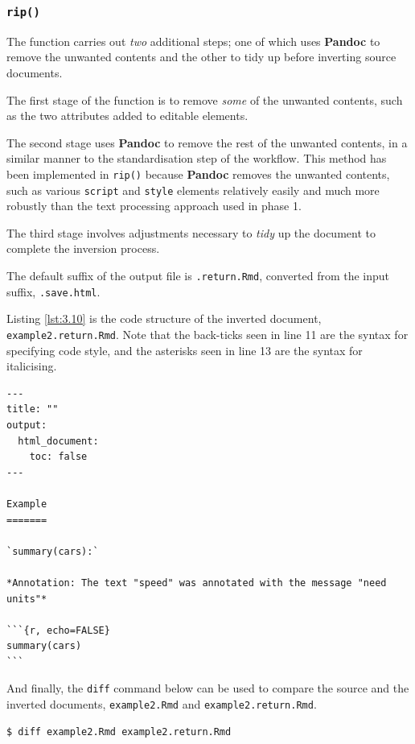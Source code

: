 \documentclass[a4paper, 12pt]{report}
\begin{document}
\subsubsection*{\texttt{rip()}}
The function carries out \emph{two} additional steps; one of which uses \textbf{Pandoc} to remove the unwanted contents and the other to tidy up before inverting source documents.

The first stage of the function is to remove \emph{some} of the unwanted contents, such as the two attributes added to editable elements.

The second stage uses \textbf{Pandoc} to remove the rest of the unwanted contents, in a similar manner to the standardisation step of the workflow. This method has been implemented in \texttt{rip()} because \textbf{Pandoc} removes the unwanted contents, such as various \texttt{script} and \texttt{style} elements relatively easily and much more robustly than the text processing approach used in phase 1.

The third stage involves adjustments necessary to \emph{tidy} up the document to complete the inversion process.

The default suffix of the output file is \texttt{.return.Rmd}, converted from the input suffix, \texttt{.save.html}.

Listing \ref{lst:3.10} is the code structure of the inverted document, \texttt{example2.return.Rmd}. Note that the back-ticks seen in line 11 are the syntax for specifying code style, and the asterisks seen in line 13 are the syntax for italicising.
\begin{lstlisting}[caption={\texttt{example2.return.html}}, escapechar=\|, label={lst:3.10}]
---
title: ""
output:
  html_document:
    toc: false
---

Example
=======

`summary(cars):`

*Annotation: The text "speed" was annotated with the message "need units"*

```{r, echo=FALSE}
summary(cars)
```
\end{lstlisting}

And finally, the \texttt{diff} command below can be used to compare the source and the inverted documents, \texttt{example2.Rmd} and \texttt{example2.return.Rmd}.
\begin{lstlisting}[frame=none, numbers=none]
$ diff example2.Rmd example2.return.Rmd
\end{lstlisting}
\end{document}
